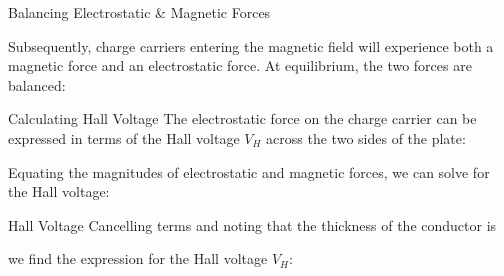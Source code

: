 \documentclass[12pt,aspectratio=169]{beamer}
\begin{document}
\begin{frame}[t]{Balancing Electrostatic \& Magnetic Forces}
  \begin{center}
  \end{center}
  Subsequently, charge carriers entering the magnetic field will experience
  both a magnetic force and an electrostatic force. At equilibrium, the two
  forces are balanced:

\end{frame}



\begin{frame}{Calculating Hall Voltage}
  The electrostatic force on the charge carrier can be expressed in terms of
  the Hall voltage $V_H$ across the two sides of the plate:

  
  Equating the magnitudes of electrostatic and magnetic forces, we can solve
  for the Hall voltage:

\end{frame}


\begin{frame}{Hall Voltage}
  Cancelling terms and noting that the thickness of the conductor is


  we find the expression for the Hall voltage $V_H$:

\end{frame}
\end{document}
